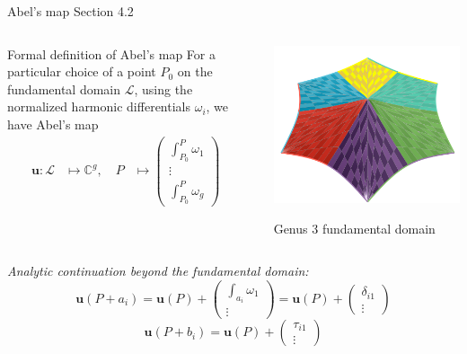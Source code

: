 \documentclass[11pt,aspectratio=169]{beamer}
\begin{document}
\begin{frame}[noframenumbering]{Abel's map}{\tiny \cite{Ber06} Section 4.2}
    \begin{columns}
        \begin{column}{0.55\textwidth}
            \begin{block}{Formal definition of Abel's map}
                For a particular choice of a point $P_0$ on the fundamental domain $\mathcal L$, using the normalized harmonic differentials $\omega_i$, we have Abel's map
                \begin{align*}
                    \mathbf{u} : \mathcal L & \mapsto \mathbb{C}^g , \quad P & \mapsto \begin{pmatrix} \int_{P_0}^P \omega_1 \\ \vdots \\ \int_{P_0}^P \omega_g \end{pmatrix} &
                \end{align*}
            \end{block}
        \end{column}
        \begin{column}{0.45\textwidth}
            \center

            \includegraphics[width=0.7\columnwidth]{assets/Genus3Domain.png}

            \tiny Genus 3 fundamental domain
        \end{column}
    \end{columns}

    \emph{Analytic continuation beyond the fundamental domain:}
    \[\mathbf{u}(P+a_i) = \mathbf{u}(P) + \begin{pmatrix} \int_{a_i} \omega_1 \\ \vdots \end{pmatrix} = \mathbf{u}(P) + \begin{pmatrix} \delta_{i1} \\ \vdots \end{pmatrix}\]
    \[\mathbf{u}(P+b_i) = \mathbf{u}(P) + \begin{pmatrix} \tau_{i1} \\ \vdots \end{pmatrix}\]
\end{frame}
\end{document}
